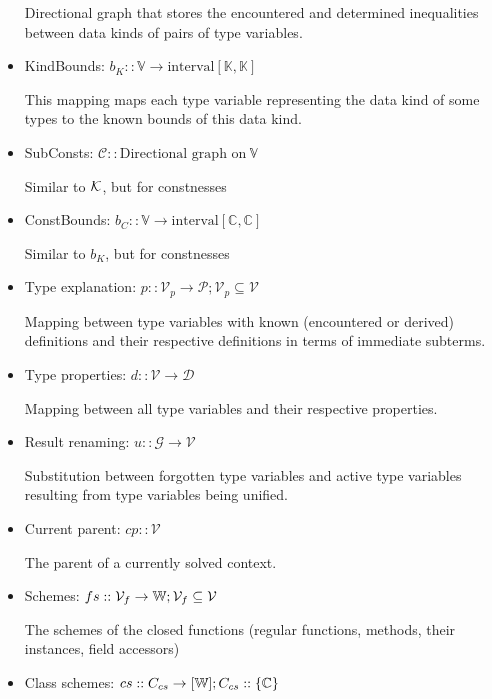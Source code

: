 \begin{itemize}
    Directional graph that stores the encountered and determined inequalities between data kinds of pairs of type variables.

    \item KindBounds: $b_K :: \mathbb{V} \to \text{interval} \left[\mathbb{K}, \mathbb{K}\right]$

    This mapping maps each type variable representing the data kind of some types to the known bounds of this data kind.

    \item SubConsts: $\mathcal{C} :: \text{Directional graph on}\ \mathbb{V}$

    Similar to $\mathcal{K}$, but for constnesses

    \item ConstBounds: $b_C :: \mathbb{V} \to \text{interval} \left[\mathbb{C}, \mathbb{C}\right]$

    Similar to $b_K$, but for constnesses

    \item Type explanation: $p :: \mathcal{V}_p \to \mathcal{P}; \mathcal{V}_p \subseteq \mathcal{V}$

    Mapping between type variables with known (encountered or derived) definitions and their respective definitions in terms of immediate subterms.

    \item Type properties: $d :: \mathcal{V} \to \mathcal{D}$

    Mapping between all type variables and their respective properties.

    \item Result renaming: $u :: \mathcal{G} \to \mathcal{V}$

    Substitution between forgotten type variables and active type variables resulting from type variables being unified.

    \item Current parent: $cp :: \mathcal{V}$

    The parent of a currently solved context.

    \item Schemes: $fs :: \mathcal{V}_f \to \mathbb{W}; \mathcal V_f \subseteq \mathcal V$

    The schemes of the closed functions (regular functions, methods, their instances, field accessors)

    \item Class schemes: $cs :: C_{cs} \to [\mathbb{W}]; C_{cs} :: \{\mathbb{C}\}$


\end{itemize}

